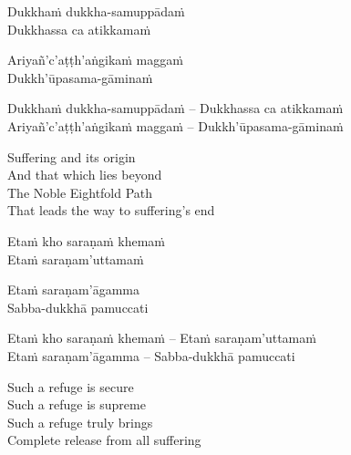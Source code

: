 \ifninebythirteen

\begin{pali-hang-verses}
  Dukkhaṁ dukkha-samuppādaṁ\\
  Dukkhassa ca atikkamaṁ
\end{pali-hang-verses}
\begin{pali-hang-together}
  Ariyañ'c'aṭṭh'aṅgikaṁ maggaṁ\\
  Dukkh'ūpasama-gāminaṁ
\end{pali-hang-together}

\else

\ifbfive\clearpage\fi

\begin{verses}
  Dukkhaṁ dukkha-samuppādaṁ – Dukkhassa ca atikkamaṁ\\
  Ariyañ'c'aṭṭh'aṅgikaṁ maggaṁ – Dukkh'ūpasama-gāminaṁ
\end{verses}

\fi

\ifafive\clearpage\fi

\begin{english-verses}
  Suffering and its origin\\
  And that which lies beyond\\
  The Noble Eightfold Path\\
  That leads the way to suffering's end
\end{english-verses}

\ifninebythirteen

\clearpage

\begin{pali-hang-verses}
  Etaṁ kho saraṇaṁ khemaṁ\\
  Etaṁ saraṇam'uttamaṁ
\end{pali-hang-verses}
\begin{pali-hang-together}
  Etaṁ saraṇam'āgamma\\
  Sabba-dukkhā pamuccati
\end{pali-hang-together}

\else

\begin{verses}
  Etaṁ kho saraṇaṁ khemaṁ – Etaṁ saraṇam'uttamaṁ\\
  Etaṁ saraṇam'āgamma – Sabba-dukkhā pamuccati
\end{verses}

\fi

\begin{english-verses}
  Such a refuge is secure\\
  Such a refuge is supreme\\
  Such a refuge truly brings\\
  Complete release from all suffering
\end{english-verses}

